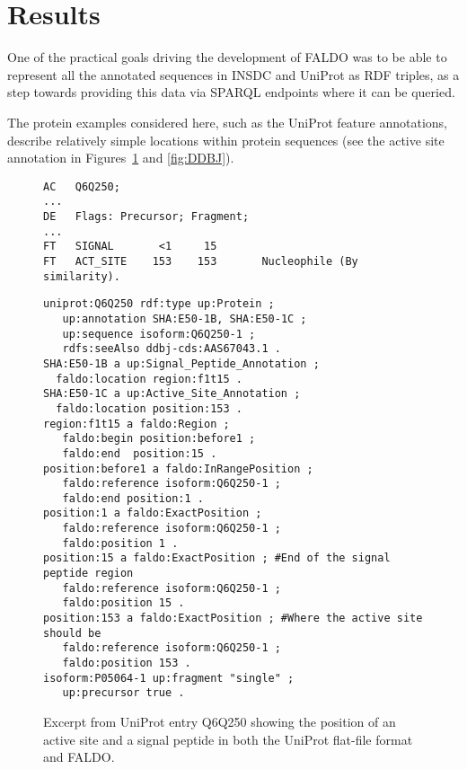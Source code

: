 \section*{Results}
One of the practical goals driving the development of FALDO was to be able
to represent all the annotated sequences in INSDC and UniProt as RDF
triples, as a step towards providing this data via SPARQL endpoints where
it can be queried.

The protein examples considered here, such as the UniProt feature annotations,
describe relatively simple locations within protein sequences
(see the active site annotation in Figures~\ref{fig:UniProt} and \ref{fig:DDBJ}).

\begin{figure}
\begin{shaded}
\small
\begin{verbatim}
AC   Q6Q250;
...
DE   Flags: Precursor; Fragment;
...
FT   SIGNAL       <1     15
FT   ACT_SITE    153    153       Nucleophile (By similarity).
\end{verbatim}
\begin{verbatim}
uniprot:Q6Q250 rdf:type up:Protein ;
   up:annotation SHA:E50-1B, SHA:E50-1C ;
   up:sequence isoform:Q6Q250-1 ;
   rdfs:seeAlso ddbj-cds:AAS67043.1 .
SHA:E50-1B a up:Signal_Peptide_Annotation ;
  faldo:location region:f1t15 .
SHA:E50-1C a up:Active_Site_Annotation ;
  faldo:location position:153 .
region:f1t15 a faldo:Region ;
   faldo:begin position:before1 ;
   faldo:end  position:15 .
position:before1 a faldo:InRangePosition ;
   faldo:reference isoform:Q6Q250-1 ;
   faldo:end position:1 . 
position:1 a faldo:ExactPosition ;
   faldo:reference isoform:Q6Q250-1 ;
   faldo:position 1 .
position:15 a faldo:ExactPosition ; #End of the signal peptide region
   faldo:reference isoform:Q6Q250-1 ;
   faldo:position 15 .   
position:153 a faldo:ExactPosition ; #Where the active site should be
   faldo:reference isoform:Q6Q250-1 ;
   faldo:position 153 .
isoform:P05064-1 up:fragment "single" ;
   up:precursor true .
\end{verbatim}
\end{shaded}
\caption{Excerpt from UniProt entry Q6Q250 showing the position of an active site and a signal peptide in both the UniProt flat-file format and FALDO.}
\label{fig:UniProt}
\end{figure}
